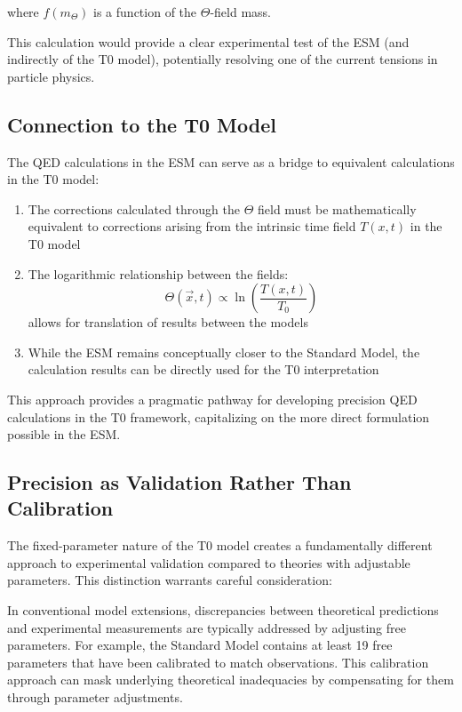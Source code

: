 \documentclass[12pt,a4paper]{article}
\newcommand{\Tfieldt}{T(x,t)}
\newcommand{\Tzero}{T_0}
\newcommand{\vecx}{\vec{x}}
\begin{document}
	where $f(m_{\Theta})$ is a function of the $\Theta$-field mass.
	
	This calculation would provide a clear experimental test of the ESM (and indirectly of the T0 model), potentially resolving one of the current tensions in particle physics.
	
	\subsection{Connection to the T0 Model}
	\label{subsec:t0_connection}
	
	The QED calculations in the ESM can serve as a bridge to equivalent calculations in the T0 model:
	
	\begin{enumerate}
		\item The corrections calculated through the $\Theta$ field must be mathematically equivalent to corrections arising from the intrinsic time field $\Tfieldt$ in the T0 model
		\item The logarithmic relationship between the fields:
		\begin{equation}
			\Theta(\vecx,t) \propto \ln\left(\frac{\Tfieldt}{\Tzero}\right)
			\label{eq:log_relationship}
		\end{equation}
		allows for translation of results between the models
		\item While the ESM remains conceptually closer to the Standard Model, the calculation results can be directly used for the T0 interpretation
	\end{enumerate}
	
	This approach provides a pragmatic pathway for developing precision QED calculations in the T0 framework, capitalizing on the more direct formulation possible in the ESM.
	
	\subsection{Precision as Validation Rather Than Calibration}
	\label{subsec:precision_validation}
	
	The fixed-parameter nature of the T0 model creates a fundamentally different approach to experimental validation compared to theories with adjustable parameters. This distinction warrants careful consideration:
	
	In conventional model extensions, discrepancies between theoretical predictions and experimental measurements are typically addressed by adjusting free parameters. For example, the Standard Model contains at least 19 free parameters that have been calibrated to match observations. This calibration approach can mask underlying theoretical inadequacies by compensating for them through parameter adjustments.
	
\end{document}
